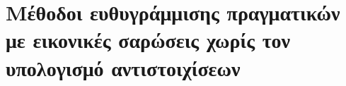 


\chapter{Μέθοδοι ευθυγράμμισης πραγματικών με εικονικές σαρώσεις χωρίς τον υπολογισμό αντιστοιχίσεων}
  \label{part:02:chapter:04}
  

